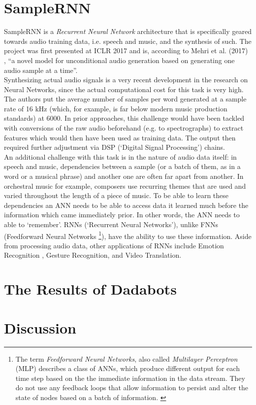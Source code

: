 \documentclass[a4paper, 11pt]{report}
\begin{document}
\chapter{SampleRNN}
SampleRNN is a \textit{Recurrent Neural Network} architecture that is specifically 
geared towards audio training data, i.e. speech and music, and the synthesis 
of such. The project was first presented at ICLR 2017 and is, according to 
Mehri et al. (2017) %
, “a novel model for unconditional audio generation 
based on generating one audio sample at a time”. \\
Synthesizing actual audio signals is a very recent development in the 
research on Neural Networks, since the actual computational cost for this 
task is very high. The authors put the average number of samples per word 
generated at a sample rate of 16 kHz (which, for example, is far below 
modern music production standards) at 6000\cite{mehri2016samplernn}. 
In prior approaches, this 
challenge would have been tackled with conversions of the raw audio 
beforehand (e.g. to spectrographs) to extract features which would then 
have been used as training data. The output then required further 
adjustment via DSP (‘Digital Signal Processing’) chains. \\
An additional challenge with this task is in the nature of audio data itself: 
in speech and music, dependencies between a sample (or a batch of them, as in 
a word or a musical phrase) and another one are often far apart from another. 
In orchestral music for example, composers use recurring themes that are 
used and varied throughout the length of a piece of music. To be able to learn 
these dependencies an ANN needs to be able to access data it learned much before 
the information which came immediately prior. In other words, the ANN needs to 
able to ‘remember’. RNNs (‘Recurrent Neural Networks’), unlike FNNs 
(Feedforward Neural Networks
\footnote{The term \textit{Feedforward Neural Networks}, 
also called \textit{Multilayer Perceptron} (MLP) describes a class of ANNs, 
which produce different output for each time step based on the the immediate 
information in the data stream. They do not use any feedback loops that allow 
information to persist and alter the state of nodes based on a batch of information.
\cite[p. 164]{goodfellow2016deep}}), 
have the ability to use these information. Aside 
from processing audio data, other applications of RNNs include Emotion Recognition
\cite{ebrahimi2015recurrent}, 
Gesture Recognition\cite[]{murakami1991gesture}, and Video Translation\cite{venugopalan2014translating}.  \\


\chapter{The Results of Dadabots}


\chapter{Discussion}




\end{document}
